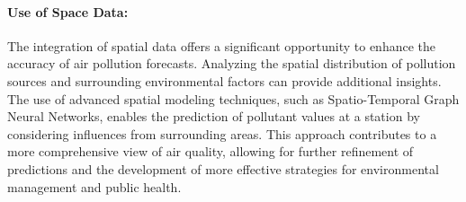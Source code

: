 \paragraph{Use of Space Data:}
The integration of spatial data offers a significant opportunity to enhance the accuracy of air pollution forecasts. Analyzing the spatial distribution of pollution sources and surrounding environmental factors can provide additional insights. The use of advanced spatial modeling techniques, such as Spatio-Temporal Graph Neural Networks, enables the prediction of pollutant values at a station by considering influences from surrounding areas. This approach contributes to a more comprehensive view of air quality, allowing for further refinement of predictions and the development of more effective strategies for environmental management and public health.

